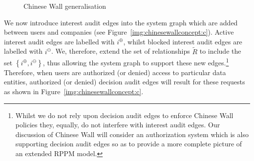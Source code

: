 \documentclass{article}
\newcommand{\set}[1]{\ensuremath{\left\{#1\right\}}} \newcommand{\setO}[1]{\ensuremath{\left\{#1\right.}} \newcommand{\setC}[1]{\ensuremath{\left.#1\right\}}} \newcommand{\setN}[1]{\ensuremath{\left.#1\right.}} \newcommand{\sett}[1]{\ensuremath{\left\{\textit{#1}\right\}}} \newcommand{\tuple}[1]{\ensuremath{\left(#1\right)}} \newcommand{\tuplet}[1]{\ensuremath{\left(\textit{#1}\right)}} \newcommand{\card}[1]{\left| #1 \right|}
\newcommand{\RcoR}{\ensuremath{\widetilde{R}}} \newcommand{\entity}[1]{\ensuremath{#1}} \newcommand{\rel}[1]{\ensuremath{#1}} \newcommand{\relw}[1]{\textsf{#1}} \newcommand{\comp}{\mathbin{;}} \newcommand{\relpc}[1]{\textsf{#1}} \newcommand{\princ}[1]{\textsf{#1}} \newcommand{\ppmc}{\ensuremath{\phi}} \newcommand{\npmc}{\ensuremath{\psi}} \newcommand{\pmp}{\ensuremath{\rho}} \newcommand{\act}[1]{\textsf{#1}} \newcommand{\crs}{\ensuremath{\chi}} \newcommand{\crso}[1]{\textsf{#1}} \newcommand{\defo}[1]{#1} \newcommand{\mpalg}{\textsf{MatchPrincipal}\xspace} \renewcommand{\algorithmiccomment}[1]{// #1} \newcommand{\audita}[1]{\ensuremath{#1^\oplus}}
\newcommand{\auditd}[1]{\ensuremath{#1^\ominus}}
\newcommand{\interesta}{\ensuremath{i^\oplus}}
\newcommand{\interestb}{\ensuremath{i^\ominus}}
\newcommand{\setinterest}{\ensuremath{\set{i^\oplus,i^\ominus}}}
\begin{document}
\begin{figure}[!ht]
{
        \label{img:chinesewallconcept:c}
    }
    \caption{Chinese Wall generalisation}\label{img:chinesewallconcept}
\end{figure}


We now introduce interest audit edges into the system graph which are added between users and companies (see Figure~\ref{img:chinesewallconcept:c}).
Active interest audit edges are labelled with \interesta, whilst blocked interest audit edges are labelled with \interestb.
We, therefore, extend the set of relationships $\RcoR$ to include the set $\setinterest$, thus allowing the system graph to support these new edges.\footnote{Whilst we do not rely upon decision audit edges to enforce Chinese Wall policies they, equally, do not interfere with interest audit edges.
Our discussion of Chinese Wall will consider an authorization system which is also supporting decision audit edges so as to provide a more complete picture of an extended RPPM model.}
Therefore, when users are authorized (or denied) access to particular data entities, authorized (or denied) decision audit edges will result for these requests as shown in Figure~\ref{img:chinesewallconcept:c}.
\end{document}
